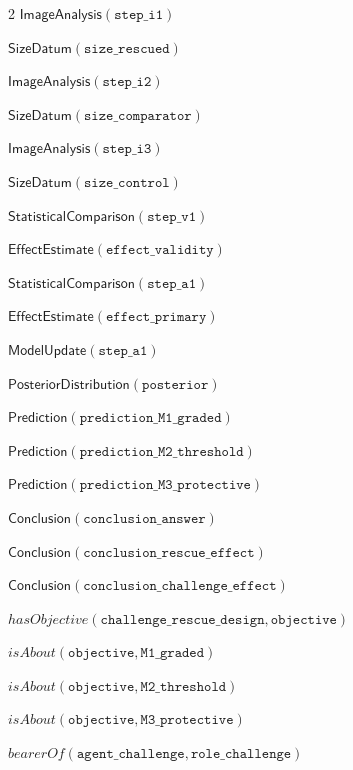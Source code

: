 \documentclass[10pt,a4paper]{article}
\begin{document}
{\begin{multicols}{2}
$\mathsf{ImageAnalysis}(\mathtt{step\_\allowbreak{}i1})$\par
$\mathsf{SizeDatum}(\mathtt{size\_\allowbreak{}rescued})$\par
$\mathsf{ImageAnalysis}(\mathtt{step\_\allowbreak{}i2})$\par
$\mathsf{SizeDatum}(\mathtt{size\_\allowbreak{}comparator})$\par
$\mathsf{ImageAnalysis}(\mathtt{step\_\allowbreak{}i3})$\par
$\mathsf{SizeDatum}(\mathtt{size\_\allowbreak{}control})$\par
$\mathsf{StatisticalComparison}(\mathtt{step\_\allowbreak{}v1})$\par
$\mathsf{EffectEstimate}(\mathtt{effect\_\allowbreak{}validity})$\par
$\mathsf{StatisticalComparison}(\mathtt{step\_\allowbreak{}a1})$\par
$\mathsf{EffectEstimate}(\mathtt{effect\_\allowbreak{}primary})$\par
$\mathsf{ModelUpdate}(\mathtt{step\_\allowbreak{}a1})$\par
$\mathsf{PosteriorDistribution}(\mathtt{posterior})$\par
$\mathsf{Prediction}(\mathtt{prediction\_\allowbreak{}M1\_\allowbreak{}graded})$\par
$\mathsf{Prediction}(\mathtt{prediction\_\allowbreak{}M2\_\allowbreak{}threshold})$\par
$\mathsf{Prediction}(\mathtt{prediction\_\allowbreak{}M3\_\allowbreak{}protective})$\par
$\mathsf{Conclusion}(\mathtt{conclusion\_\allowbreak{}answer})$\par
$\mathsf{Conclusion}(\mathtt{conclusion\_\allowbreak{}rescue\_\allowbreak{}effect})$\par
$\mathsf{Conclusion}(\mathtt{conclusion\_\allowbreak{}challenge\_\allowbreak{}effect})$\par
$\mathit{hasObjective}(\mathtt{challenge\_\allowbreak{}rescue\_\allowbreak{}design}, \mathtt{objective})$\par
$\mathit{isAbout}(\mathtt{objective}, \mathtt{M1\_\allowbreak{}graded})$\par
$\mathit{isAbout}(\mathtt{objective}, \mathtt{M2\_\allowbreak{}threshold})$\par
$\mathit{isAbout}(\mathtt{objective}, \mathtt{M3\_\allowbreak{}protective})$\par
$\mathit{bearerOf}(\mathtt{agent\_\allowbreak{}challenge}, \mathtt{role\_\allowbreak{}challenge})$\par

\end{multicols}}
\end{document}
